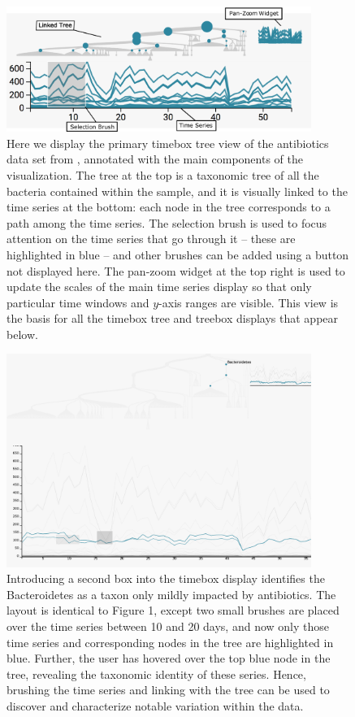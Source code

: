 \documentclass[12pt]{article}
\begin{document}
\begin{figure}

{\centering \includegraphics[width=375px]{figure/annotated_antibiotic_overview}

}

\caption{Here we display the primary timebox tree view of the antibiotics data
  set from \citep{dethlefsen2008pervasive}, annotated with the main components of the
  visualization. The tree at the top is a taxonomic tree of all the bacteria
  contained within the sample, and it is visually linked to the time series at
  the bottom: each node in the tree corresponds to a path among the time series.
  The selection brush is used to focus attention on the time series that go
  through it -- these are highlighted in blue -- and other brushes can be added
  using a button not displayed here. The pan-zoom widget at the top right is
  used to update the scales of the main time series display so that only
  particular time windows and $y$-axis ranges are visible. This view is the
  basis for all the timebox tree and treebox displays that appear
  below. \label{fig:antibioticoverview}}
\end{figure}

\begin{figure}

{\centering \includegraphics[width=375px]{figure/antibiotic_bacteroidetes}

}

\caption{Introducing a second box into the timebox display identifies the
  Bacteroidetes as a taxon only mildly impacted by antibiotics. The layout is
  identical to Figure 1, except two small brushes are placed over the time
  series between 10 and 20 days, and now only those time series and
  corresponding nodes in the tree are highlighted in blue. Further, the user has
  hovered over the top blue node in the tree, revealing the taxonomic identity
  of these series. Hence, brushing the time series and linking with the tree can
  be used to discover and characterize notable variation within the
  data.\label{fig:antibioticbacteroidetes}}
\end{figure}
\end{document}
